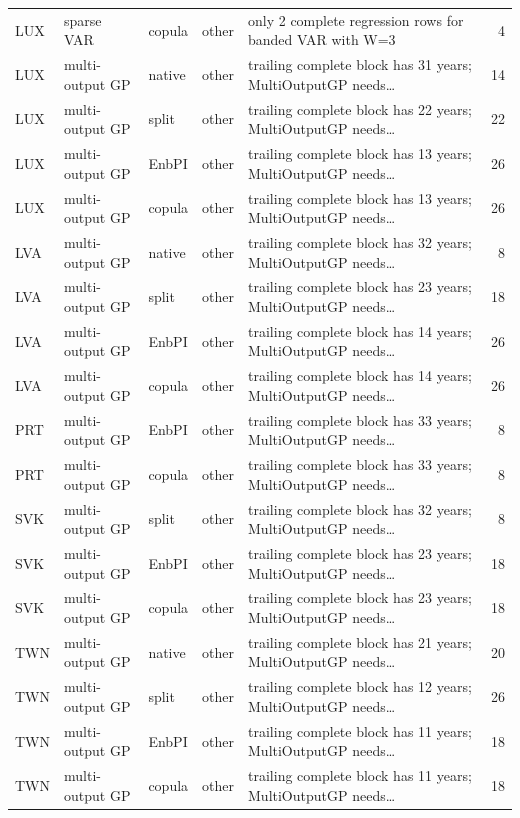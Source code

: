 {\begin{longtable}{@{}lllp{1.6cm}p{6.2cm}r@{}}
LUX & sparse VAR & copula & other & only 2 complete regression rows for banded VAR with W=3 & 4 \\
LUX & multi-output GP & native & other & trailing complete block has 31 years; MultiOutputGP needs\ldots & 14 \\
LUX & multi-output GP & split & other & trailing complete block has 22 years; MultiOutputGP needs\ldots & 22 \\
LUX & multi-output GP & EnbPI & other & trailing complete block has 13 years; MultiOutputGP needs\ldots & 26 \\
LUX & multi-output GP & copula & other & trailing complete block has 13 years; MultiOutputGP needs\ldots & 26 \\
LVA & multi-output GP & native & other & trailing complete block has 32 years; MultiOutputGP needs\ldots & 8 \\
LVA & multi-output GP & split & other & trailing complete block has 23 years; MultiOutputGP needs\ldots & 18 \\
LVA & multi-output GP & EnbPI & other & trailing complete block has 14 years; MultiOutputGP needs\ldots & 26 \\
LVA & multi-output GP & copula & other & trailing complete block has 14 years; MultiOutputGP needs\ldots & 26 \\
PRT & multi-output GP & EnbPI & other & trailing complete block has 33 years; MultiOutputGP needs\ldots & 8 \\
PRT & multi-output GP & copula & other & trailing complete block has 33 years; MultiOutputGP needs\ldots & 8 \\
SVK & multi-output GP & split & other & trailing complete block has 32 years; MultiOutputGP needs\ldots & 8 \\
SVK & multi-output GP & EnbPI & other & trailing complete block has 23 years; MultiOutputGP needs\ldots & 18 \\
SVK & multi-output GP & copula & other & trailing complete block has 23 years; MultiOutputGP needs\ldots & 18 \\
TWN & multi-output GP & native & other & trailing complete block has 21 years; MultiOutputGP needs\ldots & 20 \\
TWN & multi-output GP & split & other & trailing complete block has 12 years; MultiOutputGP needs\ldots & 26 \\
TWN & multi-output GP & EnbPI & other & trailing complete block has 11 years; MultiOutputGP needs\ldots & 18 \\
TWN & multi-output GP & copula & other & trailing complete block has 11 years; MultiOutputGP needs\ldots & 18 \\

\end{longtable}}
